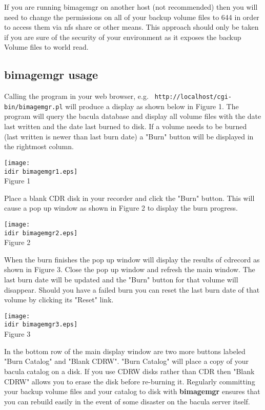 If you are running bimagemgr on another host (not recommended) then you will
need to change the permissions on all of your backup volume files to 644 in 
order to access them via nfs share or other means. This approach should only 
be taken if you are sure of the security of your environment as it exposes 
the backup Volume files to world read.

\subsection{bimagemgr usage}

Calling the program in your web browser, e.g. {\tt
http://localhost/cgi-bin/bimagemgr.pl} will produce a display as shown below
in Figure 1. The program will query the bacula database and display all volume
files with the date last written and the date last burned to disk. If a volume
needs to be burned (last written is newer than last burn date) a "Burn"
button will be displayed in the rightmost column. 

\texttt{[image: \\idir bimagemgr1.eps]} \\Figure 1 

Place a blank CDR disk in your recorder and click the "Burn" button. This will
cause a pop up window as shown in Figure 2 to display the burn progress. 

\texttt{[image: \\idir bimagemgr2.eps]} \\Figure 2 

When the burn finishes the pop up window will display the results of cdrecord
as shown in Figure 3. Close the pop up window and refresh the main window. The
last burn date will be updated and the "Burn" button for that volume will
disappear. Should you have a failed burn you can reset the last burn date of
that volume by clicking its "Reset" link. 

\texttt{[image: \\idir bimagemgr3.eps]} \\Figure 3 

In the bottom row of the main display window are two more buttons labeled
"Burn Catalog" and "Blank CDRW". "Burn Catalog" will place a copy of
your bacula catalog on a disk. If you use CDRW disks rather than CDR then
"Blank CDRW" allows you to erase the disk before re-burning it. Regularly
committing your backup volume files and your catalog to disk with {\bf
bimagemgr} ensures that you can rebuild easily in the event of some disaster
on the bacula server itself. 
